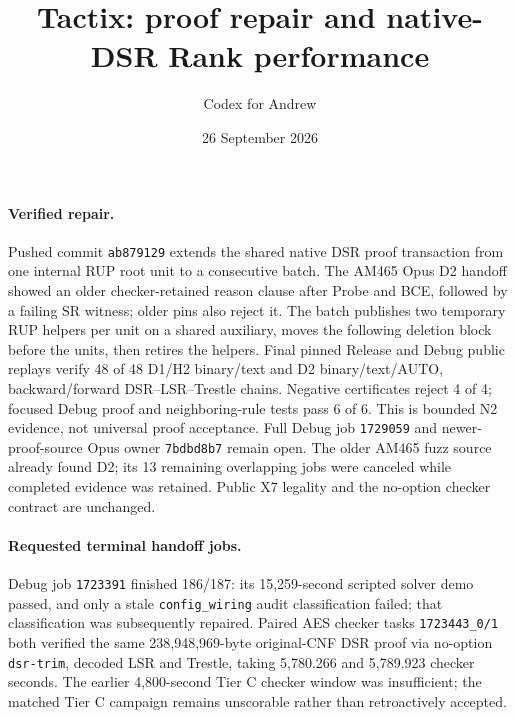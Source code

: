 \documentclass[11pt]{article}
\title{Tactix: proof repair and native-DSR Rank performance}
\author{Codex for Andrew}
\date{26 September 2026}
\begin{document}
\maketitle

\paragraph{Verified repair.}
Pushed commit \texttt{ab879129} extends the shared native DSR proof transaction from one internal RUP root unit to a consecutive batch. The AM465 Opus D2 handoff showed an older checker-retained reason clause after Probe and BCE, followed by a failing SR witness; older pins also reject it. The batch publishes two temporary RUP helpers per unit on a shared auxiliary, moves the following deletion block before the units, then retires the helpers. Final pinned Release and Debug public replays verify 48 of 48 D1/H2 binary/text and D2 binary/text/AUTO, backward/forward DSR--LSR--Trestle chains. Negative certificates reject 4 of 4; focused Debug proof and neighboring-rule tests pass 6 of 6. This is bounded N2 evidence, not universal proof acceptance. Full Debug job \texttt{1729059} and newer-proof-source Opus owner \texttt{7bdbd8b7} remain open. The older AM465 fuzz source already found D2; its 13 remaining overlapping jobs were canceled while completed evidence was retained. Public X7 legality and the no-option checker contract are unchanged.

\paragraph{Requested terminal handoff jobs.}
Debug job \texttt{1723391} finished 186/187: its 15,259-second scripted solver demo passed, and only a stale \texttt{config\_wiring} audit classification failed; that classification was subsequently repaired. Paired AES checker tasks \texttt{1723443\_0/1} both verified the same 238,948,969-byte original-CNF DSR proof via no-option \texttt{dsr-trim}, decoded LSR and Trestle, taking 5,780.266 and 5,789.923 checker seconds. The earlier 4,800-second Tier C checker window was insufficient; the matched Tier C campaign remains unscorable rather than retroactively accepted.
\end{document}

